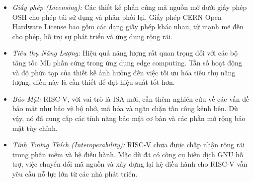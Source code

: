 \begin{itemize}
    \item \textit{Giấy phép (Licensing):} Các thiết kế phần cứng mã nguồn mở dưới giấy phép OSH cho phép tái sử dụng và phân phối lại. Giấy phép CERN Open Hardware License bao gồm các dạng giấy phép khác nhau, từ mạnh mẽ đến cho phép, hỗ trợ sự phát triển và ứng dụng rộng rãi.
    
    \item \textit{Tiêu thụ Năng Lượng:} Hiệu quả năng lượng rất quan trọng đối với các bộ tăng tốc ML phần cứng trong ứng dụng edge computing. Tần số hoạt động và độ phức tạp của thiết kế ảnh hưởng đến việc tối ưu hóa tiêu thụ năng lượng, điều này là cần thiết để đạt hiệu suất tốt hơn.
    
    \item \textit{Bảo Mật:} RISC-V, với vai trò là ISA mới, cần thêm nghiên cứu về các vấn đề bảo mật như bảo vệ bộ nhớ, mã hóa và ngăn chặn tấn công kênh bên. Dù vậy, nó đã cung cấp các tính năng bảo mật cơ bản và các phần mở rộng bảo mật tùy chỉnh.
    
    \item \textit{Tính Tương Thích (Interoperability):} RISC-V chưa được chấp nhận rộng rãi trong phần mềm và hệ điều hành. Mặc dù đã có công cụ biên dịch GNU hỗ trợ, việc chuyển đổi mã nguồn và xây dựng lại hệ điều hành cho RISC-V vẫn yêu cầu nỗ lực lớn từ các nhà phát triển.
\end{itemize}




